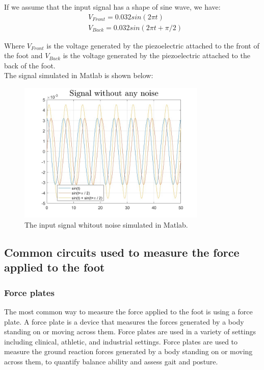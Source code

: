 If we assume that the input signal has a shape of sine wave, we have:
\begin{align}
     & V_{Front} = 0.032  sin(2\pi t)        \\
     & V_{Back} = 0.032  sin(2\pi t + \pi/2)
\end{align}

Where $V_{Front}$ is the voltage generated by the piezoelectric attached to the front of the foot and $V_{Back}$ is the voltage generated by the piezoelectric attached to the back of the foot.\\
The signal simulated in Matlab is shown below:
\begin{figure}[H]
    \centering
    \includegraphics[width=0.8\textwidth]{../Report/Figures/2.CircuitDesign/InputSignal.jpg}
    \caption{The input signal whitout noise simulated in Matlab.}
\end{figure}
\subsection{Common circuits used to measure the force applied to the foot}
\subsubsection{Force plates}
The most common way to measure the force applied to the foot is using a force plate. A force plate is a device that measures the forces generated by a body standing on or moving across them. Force plates are used in a variety of settings including clinical, athletic, and industrial settings. Force plates are used to measure the ground reaction forces generated by a body standing on or moving across them, to quantify balance ability and assess gait and posture.
\\
